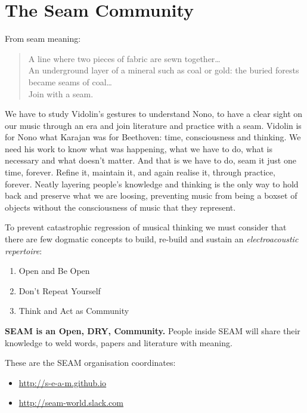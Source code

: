 \documentclass[twoside,a4paper]{article}
\begin{document}
\section{The Seam Community}
\label{sec:seam}

From seam meaning:

\begin{quote}
\begin{it}
A line where two pieces of fabric are sewn together\ldots \\
An underground layer of a mineral such as coal or gold: the buried forests became seams of coal\ldots\\
Join with a seam.
\end{it}
\end{quote}

We have to study Vidolin's gestures to understand Nono, to have a clear sight on our music through an era and join literature and practice with a seam. Vidolin is for Nono what Karajan was for Beethoven: time, consciousness and thinking. We need his work to know what was happening, what we have to do, what is necessary and what doesn't matter. And that is we have to do, seam it just one time, forever. Refine it, maintain it, and again realise it, through practice, forever. Neatly layering people's knowledge and thinking is the only way to hold back and preserve what we are loosing, preventing music from being a boxset of objects without the consciousness of music that they represent.

To prevent catastrophic regression of musical thinking we must consider that there are few dogmatic concepts to build, re-build and sustain an \emph{electroacoustic repertoire}:
\begin{enumerate}
  \item Open and Be Open
  \item Don't Repeat Yourself
  \item Think and Act as Community
\end{enumerate}

\textbf{SEAM is an Open, DRY, Community.} People inside SEAM will share their knowledge to weld words, papers and literature with meaning.

These are the SEAM organisation coordinates:
\begin{itemize}
\item \url{http://s-e-a-m.github.io}
\item \url{http://seam-world.slack.com}
\end{itemize}
\end{document}
